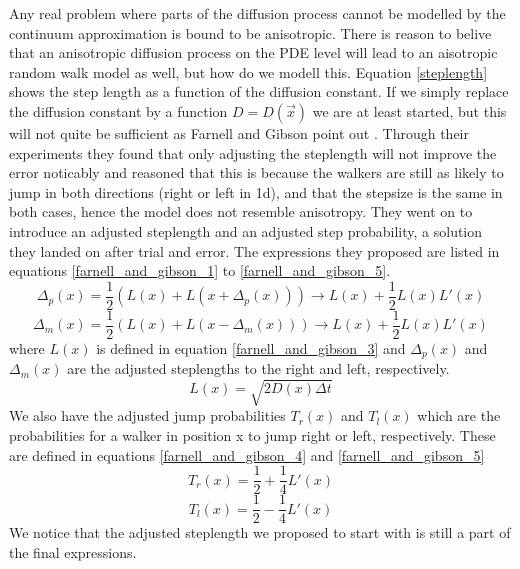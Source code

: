 Any real problem where parts of the diffusion process cannot be modelled by the continuum approximation is bound to be anisotropic. 
There is reason to belive that an anisotropic diffusion process on the PDE level will lead to an aisotropic random walk model as well, but how do we modell this. 
Equation \ref{steplength} shows the step length as a function of the diffusion constant. 
If we simply replace the diffusion constant by a function $D = D(\vec{x})$ we are at least started, but this will not quite be sufficient as Farnell and Gibson point out \cite{farnell2005monte}. 
Through their experiments they found that only adjusting the steplength will not improve the error noticably and reasoned that this is because the walkers are still as likely to jump in both directions (right or left in 1d), and that the stepsize is the same in both cases, hence the model does not resemble anisotropy. 
They went on to introduce an adjusted steplength and an adjusted step probability, a solution they landed on after trial and error. 
The expressions they proposed are listed in equations \ref{farnell_and_gibson_1} to \ref{farnell_and_gibson_5}. 
\begin{equation}\label{farnell_and_gibson_1}
 \Delta_p(x) = \frac{1}{2}\left(L(x) + L(x +\Delta_p(x))\right) \to L(x) +\frac{1}{2}L(x)L'(x)
\end{equation}
\begin{equation}\label{farnell_and_gibson_2}
 \Delta_m(x) = \frac{1}{2}\left(L(x) + L(x -\Delta_m(x))\right) \to L(x) +\frac{1}{2}L(x)L'(x)
\end{equation}
where $L(x)$ is defined in equation \ref{farnell_and_gibson_3} and $\Delta_p(x)$ and $\Delta_m(x)$ are the adjusted steplengths to the right and left, respectively.
\begin{equation}\label{farnell_and_gibson_3}
L(x) = \sqrt{2D(x)\Delta t}
\end{equation}
We also have the adjusted jump probabilities $T_r(x)$ and $T_l(x)$ which are the probabilities for a walker in position x to jump right or left, respectively. 
These are defined in equations \ref{farnell_and_gibson_4} and \ref{farnell_and_gibson_5}
\begin{equation}\label{farnell_and_gibson_4}
T_r(x) = \frac{1}{2} +\frac{1}{4}L'(x)
\end{equation}
\begin{equation}\label{farnell_and_gibson_5}
T_l(x) = \frac{1}{2} -\frac{1}{4}L'(x)
\end{equation}
We notice that the adjusted steplength we proposed to start with is still a part of the final expressions.


